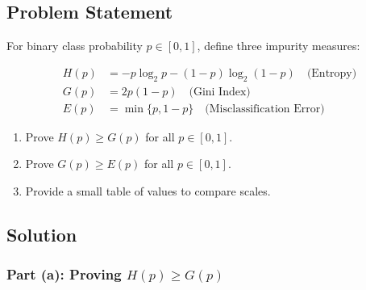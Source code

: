 \documentclass[12pt]{article}
\begin{document}
\subsection{Problem Statement}

For binary class probability $p \in [0,1]$, define three impurity measures:

\begin{align*}
H(p) &= -p \log_2 p - (1 - p) \log_2 (1 - p) \quad \text{(Entropy)} \\
G(p) &= 2p(1 - p) \quad \text{(Gini Index)} \\
E(p) &= \min\{p, 1 - p\} \quad \text{(Misclassification Error)}
\end{align*}

\begin{enumerate}
\item[(a)] Prove $H(p) \geq G(p)$ for all $p \in [0,1]$.
\item[(b)] Prove $G(p) \geq E(p)$ for all $p \in [0,1]$.
\item[(c)] Provide a small table of values to compare scales.
\end{enumerate}

\subsection{Solution}

\subsubsection{Part (a): Proving $H(p) \geq G(p)$}
\end{document}
